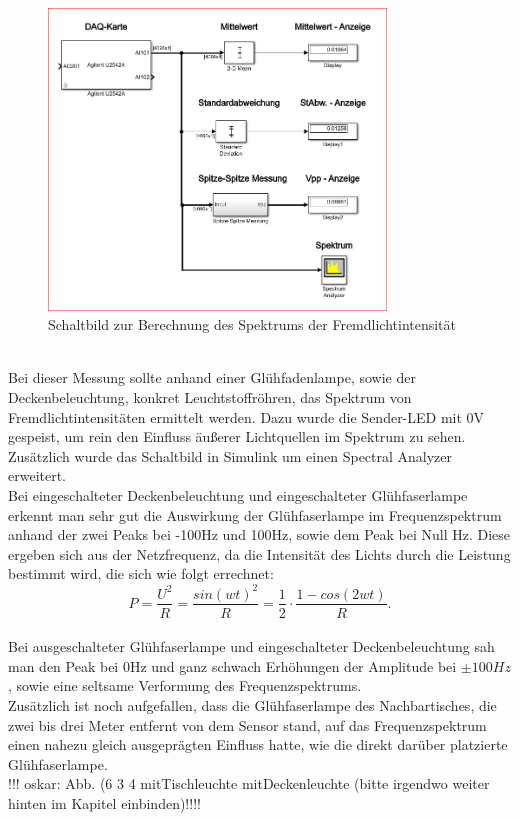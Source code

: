 \begin{figure}[h]
	\centering
	\includegraphics[width=0.8\textwidth]{./img/ch6/6_3_4}
	\caption{Schaltbild zur Berechnung des Spektrums der Fremdlichtintensität}
	\label{fg:schalt_spek}
\end{figure}
~\\
Bei dieser Messung sollte anhand einer Glühfadenlampe, sowie der Deckenbeleuchtung, konkret Leuchtstoffröhren, das Spektrum von Fremdlichtintensitäten ermittelt werden. Dazu wurde die Sender-LED mit 0V gespeist, um rein den Einfluss äußerer Lichtquellen im Spektrum zu sehen. Zusätzlich wurde das Schaltbild in Simulink um einen Spectral Analyzer erweitert.
~\\
Bei eingeschalteter Deckenbeleuchtung und eingeschalteter Glühfaserlampe erkennt man sehr gut die Auswirkung der Glühfaserlampe im Frequenzspektrum anhand der zwei Peaks bei -100Hz und 100Hz, sowie dem Peak bei Null Hz. Diese ergeben sich aus der Netzfrequenz, da die Intensität des Lichts durch die Leistung bestimmt wird, die sich wie folgt errechnet:
\begin{equation}
	 P = \dfrac{U^2}{R} = \dfrac{sin(wt)^2}{R} = \dfrac{1}{2} \cdot \dfrac{1 - cos(2wt)}{R}.
\end{equation}
~\\
Bei ausgeschalteter Glühfaserlampe und eingeschalteter Deckenbeleuchtung sah man den Peak bei 0Hz und ganz schwach Erhöhungen der Amplitude bei $\pm 100Hz$, sowie eine seltsame Verformung des Frequenzspektrums.
~\\
Zusätzlich ist noch aufgefallen, dass die Glühfaserlampe des Nachbartisches, die zwei bis drei Meter entfernt von dem Sensor stand, auf das Frequenzspektrum einen nahezu gleich ausgeprägten Einfluss hatte, wie die direkt darüber platzierte Glühfaserlampe.
~\\
!!! oskar: Abb. (6 3 4 mitTischleuchte mitDeckenleuchte (bitte irgendwo weiter hinten im Kapitel einbinden)!!!!
~\\
